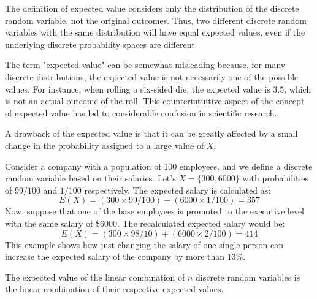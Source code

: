 The definition of expected value considers only the distribution of the discrete random variable, not the original outcomes. Thus, two different discrete random variables with the same distribution will have equal expected values, even if the underlying discrete probability spaces are different.

The term "expected value" can be somewhat misleading because, for many discrete distributions, the expected value is not necessarily one of the possible values. For instance, when rolling a six-sided die, the expected value is \(3.5\), which is not an actual outcome of the roll. This counterintuitive aspect of the concept of expected value has led to considerable confusion in scientific research.

A drawback of the expected value is that it can be greatly affected by a small change in the probability assigned to a large value of $X$.

\begin{example}\label{ex:expected_salary}
Consider a company with a population of 100 employees, and we define a discrete random variable based on their salaries. Let's $X = \{300, 6000\}$ with probabilities of $99/100$ and $1/100$ respectively. The expected salary is calculated as:
\[ 
E\left(X\right) = (300 \times 99/100) + (6000 \times 1/100) = 357
\]
Now, suppose that one of the base employees is promoted to the executive level with the same salary of \$6000. The recalculated expected salary would be:
\[
E\left(X\right) = (300 \times 98/10) + (6000 \times 2/100) = 414
\]
This example shows how just changing the salary of one single person can increase the expected salary of the company by more than $13\%$.
\end{example}

The expected value of the linear combination of $n$ discrete random variables is the linear combination of their respective expected values.

